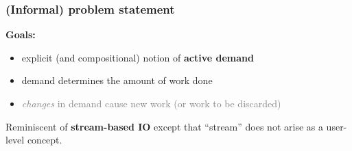 \begin{frame}
\frametitle{(Informal) problem statement}
\textbf{Goals:}
\begin{itemize}
\item \pause explicit (and compositional) notion of \textbf{active demand}
\item \pause demand determines the amount of work done
\item \pause \textcolor{gray}{\emph{changes} in demand cause new work (or work to be discarded)}
\end{itemize}

\vspace{10pt}

\pause Reminiscent of \textbf{stream-based IO} except that ``stream''
does not arise as a user-level concept.
\end{frame}
